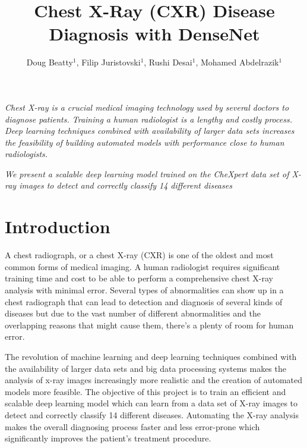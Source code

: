 \documentclass{amia}
\begin{document}
\title{Chest X-Ray (CXR) Disease Diagnosis with DenseNet}

\author{Doug Beatty$^{1}$, Filip Juristovski$^{1}$, Rushi Desai$^{1}$, Mohamed Abdelrazik$^{1}$}


\maketitle


\textit{ Chest X-ray\cite{ref1} is a crucial medical imaging technology used by several doctors to diagnose patients. Training a human radiologist is a lengthy and costly process. Deep learning techniques combined with availability of larger data sets increases the feasibility of building automated models with  performance close to human radiologists. }

\textit{We present a scalable deep learning model trained on the CheXpert \cite{ref2} data set of X-ray images to detect and correctly classify 14 different diseases}

\section*{Introduction}
A chest radiograph\cite{ref1}, or a chest X-ray (CXR) is one of the oldest and most common forms of medical imaging. A human radiologist requires significant training time and cost to be able to perform a comprehensive chest X-ray analysis with minimal error. Several types of abnormalities can show up in a chest radiograph that can lead to detection and diagnosis of several kinds of diseases but due to the vast number of different abnormalities and the overlapping reasons that might cause them, there’s a plenty of room for human error.

The revolution of machine learning and deep learning techniques combined with the availability of larger data sets\cite{ref2} and big data processing systems\cite{ref3} makes the analysis of x-ray images increasingly more realistic and the creation of automated models more feasible. The objective of this project is to train an efficient and scalable deep learning model which can learn from a data set of X-ray images to detect and correctly classify 14 different diseases. Automating the X-ray analysis makes the overall diagnosing process faster and less error-prone which significantly improves the patient’s treatment procedure.
\end{document}
